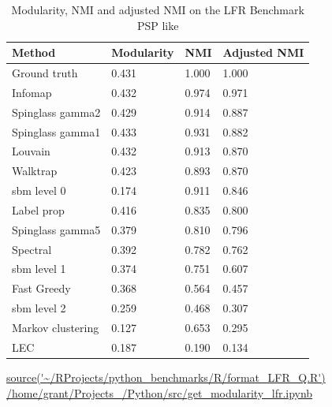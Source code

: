 \begin{table}[ht]
\centering
\setlength{\extrarowheight}{2pt}
\begin{tabular}{llll}
  \toprule
Method & Modularity & NMI & Adjusted NMI \\ 
  \midrule
Ground truth & 0.431 & 1.000 & 1.000 \\ 
  Infomap & 0.432 & 0.974 & 0.971 \\ 
  Spinglass gamma2 & 0.429 & 0.914 & 0.887 \\ 
  Spinglass gamma1 & 0.433 & 0.931 & 0.882 \\ 
  Louvain & 0.432 & 0.913 & 0.870 \\
  Walktrap & 0.423 & 0.893 & 0.870 \\ 
  sbm level 0 & 0.174 & 0.911 & 0.846 \\ 
  Label prop & 0.416 & 0.835 & 0.800 \\ 
  Spinglass gamma5 & 0.379 & 0.810 & 0.796 \\ 
  Spectral & 0.392 & 0.782 & 0.762 \\ 
  sbm level 1 & 0.374 & 0.751 & 0.607 \\ 
  Fast Greedy & 0.368 & 0.564 & 0.457 \\ 
  sbm level 2 & 0.259 & 0.468 & 0.307 \\ 
  Markov clustering & 0.127 & 0.653 & 0.295 \\ 
  LEC & 0.187 & 0.190 & 0.134 \\ 
   \bottomrule
\end{tabular}
\caption{Modularity, NMI and adjusted NMI on the LFR Benchmark PSP like} 
\tiny\url{source('~/RProjects/python_benchmarks/R/format_LFR_Q.R')}
\tiny\url{/home/grant/Projects_/Python/src/get_modularity_lfr.ipynb}
\label{tab:Modularity, NMI and adjusted NMI on the LFR Benchmark PSPlike}
\end{table}

